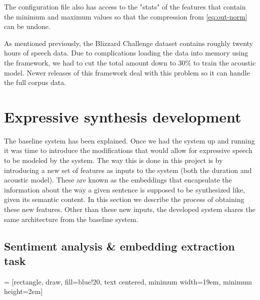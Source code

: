 The configuration file also has access to the "stats" of the features that contain the minimum and maximum values so that the compression from \ref{eq:out-norm} can be undone.

As mentioned previously, the Blizzard Challenge dataset contains roughly twenty hours of speech data. Due to complications loading the data into memory using the framework, we had to cut the total amount down to 30\% to train the acoustic model. Newer releases of this framework deal with this problem so it can handle the full corpus data.

\section{Expressive synthesis development}

The baseline system has been explained. Once we had the system up and running it was time to introduce the modifications that would allow for expressive speech to be modeled by the system. The way this is done in this project is by introducing a new set of features as inputs to the system (both the duration and acoustic model). These are known as the embeddings that encapsulate the information about the way a given sentence is supposed to be synthesized like, given its semantic content. In this section we describe the process of obtaining these new features. Other than these new inputs, the developed system shares the same architecture from the baseline system.

\subsection{Sentiment analysis \& embedding extraction task}

 = [rectangle, draw, fill=blue!20, text centered, minimum width=19em, minimum height=2em]

